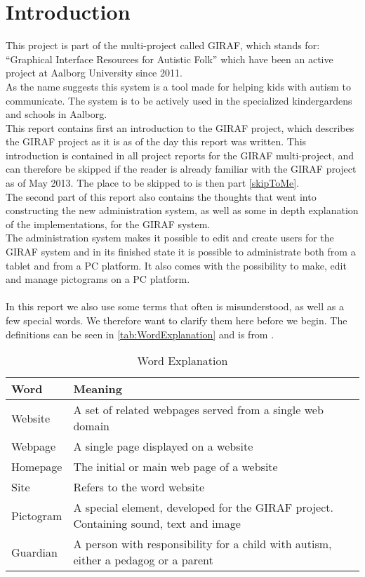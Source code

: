 \chapter*{Introduction}
\label{chap:introduction}
\vspace{-2.0em}
This project is part of the multi-project called GIRAF, which stands for: ``Graphical Interface Resources for Autistic Folk'' which have been an active project at Aalborg University since 2011.\\
As the name suggests this system is a tool made for helping kids with autism to communicate. The system is to be actively used in the specialized kindergardens and schools in Aalborg.\\
This report contains first an introduction to the GIRAF project, which describes the GIRAF project as it is as of the day this report was written. This introduction is contained in all project reports for the GIRAF multi-project, and can therefore be skipped if the reader is already familiar with the GIRAF project as of May 2013. The place to be skipped to is then part \vref{skipToMe}.\\
The second part of this report also contains the thoughts that went into constructing the new administration system, as well as some in depth explanation of the implementations, for the GIRAF system.\\
The administration system makes it possible to edit and create users for the GIRAF system and in its finished state it is possible to administrate both from a tablet and from a PC platform. It also comes with the possibility to make, edit and manage pictograms on a PC platform.\\
\\
In this report we also use some terms that often is misunderstood, as well as a few special words. We therefore want to clarify them here before we begin. The definitions can be seen in \autoref{tab:WordExplanation} and is from \citep{wikipedia}.


\begin{table}[h]
        \centering
                \begin{tabularx}{\textwidth}{|l|X|}
                        \hline
                        Word & Meaning\\\hline\hline
                        Website & A set of related webpages served from a single web domain\\\hline
                        Webpage & A single page displayed on a website\\\hline
                        Homepage & The initial or main web page of a website\\\hline
                        Site & Refers to the word website\\\hline
                        Pictogram & A special element, developed for the GIRAF project. Containing sound, text and image\\\hline
                        Guardian & A person with responsibility for a child with autism, either a pedagog or a parent\\\hline
                \end{tabularx}
        \caption{Word Explanation}
        \label{tab:WordExplanation}
\end{table}
